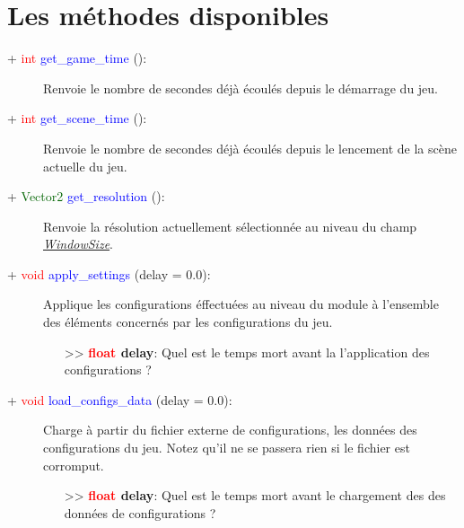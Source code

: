 \documentclass[a4paper, 11pt]{article}
\begin{document}
	\section{Les méthodes disponibles}
	\begin{description}
		\item [+ \textcolor{red}{int} \textcolor{blue}{get\_game\_time} ():] Renvoie le nombre de secondes
		déjà écoulés depuis le démarrage du jeu.\\
	\end{description}
	\begin{description}
		\item [+ \textcolor{red}{int} \textcolor{blue}{get\_scene\_time} ():] Renvoie le nombre de secondes
		déjà écoulés depuis le lencement de la scène actuelle du jeu.\\
	\end{description}
	\begin{description}
		\item [+ \textcolor{darkgreen}{Vector2} \textcolor{blue}{get\_resolution} ():] Renvoie la résolution
		actuellement sélectionnée au niveau du champ \textit{\hyperlink{winsize}{WindowSize}}.\\
	\end{description}
	\begin{description}
		\item [+ \textcolor{red}{void} \textcolor{blue}{apply\_settings} (delay = 0.0):] Applique les 
		configurations éffectuées au niveau du module à l'ensemble des éléments concernés par les
		configurations du jeu.
		\begin{itemize}
			\item [>> \textbf{\textcolor{red}{float} delay}:] Quel est le temps mort avant la l'application
			des configurations ?\\
		\end{itemize}
	\end{description}
	\begin{description}
		\item [+ \textcolor{red}{void} \textcolor{blue}{load\_configs\_data} (delay = 0.0):] Charge à partir 
		du fichier externe de configurations, les données des configurations du jeu. Notez qu'il ne se 
		passera rien si le fichier est corromput.
		\begin{itemize}
			\item [>> \textbf{\textcolor{red}{float} delay}:] Quel est le temps mort avant le chargement des
			des données de configurations ?\\
		\end{itemize}
	\end{description}
\end{document}
